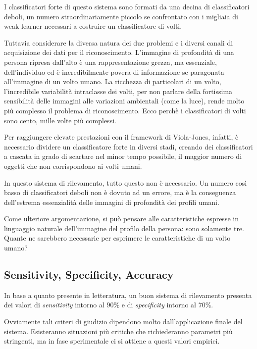                 I classificatori forte di questo sistema sono formati da una decina di classificatori deboli, un numero straordinariamente piccolo se confrontato con i migliaia di weak learner necessari a costruire un classificatore di volti.

                Tuttavia considerare la diversa natura dei due problemi e i diversi canali di acquisizione dei dati per il riconoscimento. L'immagine di profondità di una persona ripresa dall'alto è una rappresentazione grezza, ma essenziale, dell'individuo ed è incredibilmente povera di informazione se paragonata all'immagine di un volto umano.
                La ricchezza di particolari di un volto, l'incredibile variabilità intraclasse dei volti, per non parlare della fortissima sensibilità delle immagini alle variazioni ambientali (come la luce), rende molto più complesso il problema di riconoscimento. Ecco perchè i classificatori di volti sono cento, mille volte più complessi.

                Per raggiungere elevate prestazioni con il framework di Viola-Jones, infatti, è necessario dividere un classificatore forte in diversi stadi, creando dei classificatori a cascata in grado di scartare nel minor tempo possibile, il maggior numero di oggetti che non corrispondono ai volti umani.

                In questo sistema di rilevamento, tutto questo non è necessario. Un numero così basso di classificatori deboli non è dovuto ad un errore, ma è la conseguenza dell'estrema essenzialità delle immagini di profondità dei profili umani.
                
                Come ulteriore argomentazione, si può pensare alle caratteristiche espresse in linguaggio naturale dell'immagine del profilo della persona: sono solamente tre. 
                Quante ne sarebbero necessarie per esprimere le caratteristiche di un volto umano?

            \subsection{Sensitivity, Specificity, Accuracy} %
            \label{sub:sensitivity_specificity_accuracy}
                In base a quanto presente in letteratura, un buon sistema di rilevamento presenta dei valori di \emph{sensitivity} intorno al $90\%$ e di \emph{specificity} intorno al $70\%$.

                Ovviamente tali criteri di giudizio dipendono molto dall'applicazione finale del sistema.
                Esisteranno situazioni più critiche che richiederanno parametri più stringenti, ma in fase sperimentale ci si attiene a questi valori empirici.

